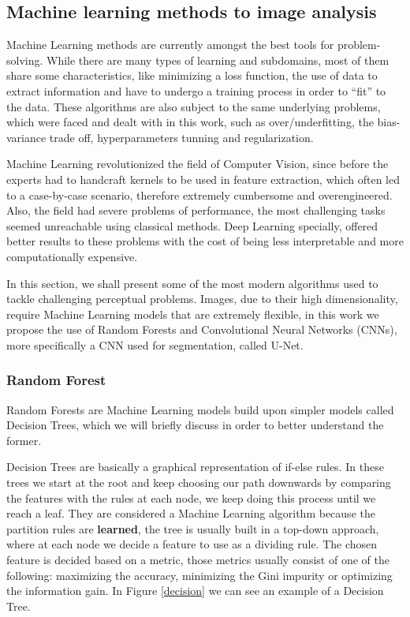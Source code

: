 \subsection{Machine learning methods to image analysis}

Machine Learning methods are currently amongst the best tools for problem-solving. While there are many types of learning and subdomains, most of them share some characteristics, like minimizing a loss function, the use of data to extract information and have to undergo a training process in order to ``fit'' to the data. These algorithms are also subject to the same underlying problems, which were faced and dealt with in this work, such as over/underfitting, the bias-variance trade off, hyperparameters tunning and regularization.

Machine Learning revolutionized the field of Computer Vision, since before the experts had to handcraft kernels to be used in feature extraction, which often led to a case-by-case scenario, therefore  extremely cumbersome and overengineered. Also, the field had severe problems of performance, the most challenging tasks seemed unreachable using classical methods. Deep Learning specially, offered better results to these problems with the cost of being less interpretable and more computationally expensive. 

In this section, we shall present some of the most modern algorithms used to tackle challenging perceptual problems. Images, due to their high dimensionality, require Machine Learning models that are extremely flexible, in this work we propose the use of Random Forests and Convolutional Neural Networks (CNNs), more specifically a CNN used for segmentation, called U-Net.

\subsubsection{Random Forest}

Random Forests are Machine Learning models build upon simpler models called Decision Trees, which we will briefly discuss in order to better understand the former. 

Decision Trees are basically a graphical representation of if-else rules. In these trees we start at the root and keep choosing our path downwards by comparing the features with the rules at each node, we keep doing this process until we reach a leaf. They are considered a Machine Learning algorithm because the partition rules are \textbf{learned}, the tree is usually built in a top-down approach, where at each node we decide a feature to use as a dividing rule. The chosen feature is decided based on a metric, those metrics usually consist of one of the following: maximizing the accuracy, minimizing the Gini impurity or optimizing the information gain. In Figure \ref{decision} we can see an example of a Decision Tree.

